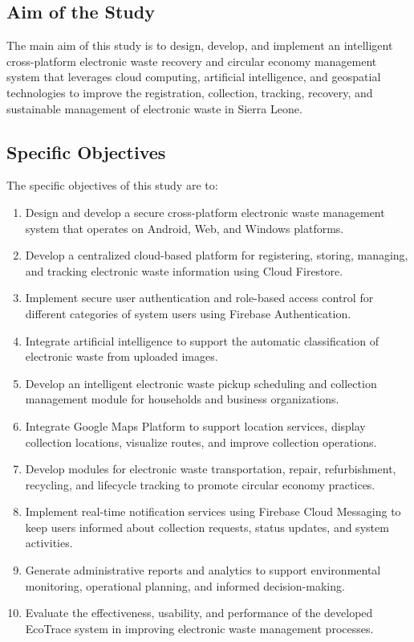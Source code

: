 \subsection{Aim of the Study}

The main aim of this study is to design, develop, and implement an intelligent
cross-platform electronic waste recovery and circular economy management system
that leverages cloud computing, artificial intelligence, and geospatial technologies to
improve the registration, collection, tracking, recovery, and sustainable management
of electronic waste in Sierra Leone.

\subsection{Specific Objectives}

The specific objectives of this study are to:

\begin{enumerate}[label=\arabic*.,leftmargin=1.4cm]
  \item Design and develop a secure cross-platform electronic waste management
    system that operates on Android, Web, and Windows platforms.
  \item Develop a centralized cloud-based platform for registering, storing, managing,
    and tracking electronic waste information using Cloud Firestore.
  \item Implement secure user authentication and role-based access control for
    different categories of system users using Firebase Authentication.
  \item Integrate artificial intelligence to support the automatic classification of
    electronic waste from uploaded images.
  \item Develop an intelligent electronic waste pickup scheduling and collection
    management module for households and business organizations.
  \item Integrate Google Maps Platform to support location services, display
    collection locations, visualize routes, and improve collection operations.
  \item Develop modules for electronic waste transportation, repair, refurbishment,
    recycling, and lifecycle tracking to promote circular economy practices.
  \item Implement real-time notification services using Firebase Cloud Messaging to
    keep users informed about collection requests, status updates, and system
    activities.
  \item Generate administrative reports and analytics to support environmental
    monitoring, operational planning, and informed decision-making.
  \item Evaluate the effectiveness, usability, and performance of the developed
    EcoTrace system in improving electronic waste management processes.
\end{enumerate}

